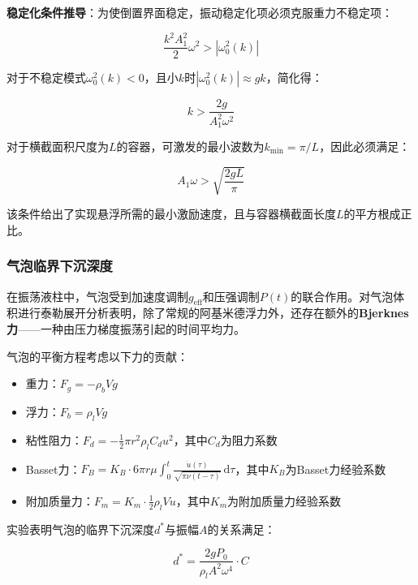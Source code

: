 \documentclass[12pt,a4paper]{ctexart}
\begin{document}
\textbf{稳定化条件推导}：为使倒置界面稳定，振动稳定化项必须克服重力不稳定项：

\begin{equation}
\frac{k^2A_1^2}{2}\omega^2 > |\omega_0^2(k)|
\end{equation}

对于不稳定模式$\omega_0^2(k)<0$，且小$k$时$|\omega_0^2(k)|\approx gk$，简化得：

\begin{equation}
k > \frac{2g}{A_1^2\omega^2}
\end{equation}

对于横截面积尺度为$L$的容器，可激发的最小波数为$k_{\min} = \pi/L$，因此必须满足：

\begin{equation}
\boxed{A_1\omega > \sqrt{\frac{2gL}{\pi}}}
\end{equation}

该条件给出了实现悬浮所需的最小激励速度，且与容器横截面长度$L$的平方根成正比。

\subsubsection{气泡临界下沉深度}

在振荡液柱中，气泡受到加速度调制$g_{\mathrm{eff}}$和压强调制$P(t)$的联合作用。对气泡体积进行泰勒展开分析表明，除了常规的阿基米德浮力外，还存在额外的\textbf{Bjerknes力}——一种由压力梯度振荡引起的时间平均力。

气泡的平衡方程考虑以下力的贡献：

\begin{itemize}
    \item 重力：$F_g = -\rho_b V g$
    \item 浮力：$F_b = \rho_l V g$
    \item 粘性阻力：$F_d = -\frac{1}{2}\pi r^2 \rho_l C_d u^2$，其中$C_d$为阻力系数
    \item Basset力：$F_B = K_B \cdot 6\pi r \mu \int_0^t \frac{\dot{u}(\tau)}{\sqrt{\pi\nu(t-\tau)}}\,\mathrm{d}\tau$，其中$K_B$为Basset力经验系数
    \item 附加质量力：$F_m = K_m \cdot \frac{1}{2}\rho_l V \dot{u}$，其中$K_m$为附加质量力经验系数
\end{itemize}

实验表明气泡的临界下沉深度$d^*$与振幅$A$的关系满足：

\begin{equation}
d^* = \frac{2gP_0}{\rho_l A^2 \omega^4} \cdot C
\end{equation}
\end{document}
